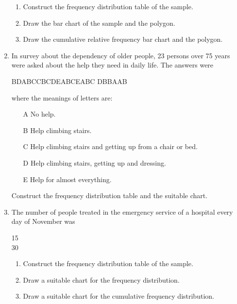 \begin{enumerate}[leftmargin=*]
\begin{enumerate}
\item Construct the frequency distribution table of the sample.
\item Draw the bar chart of the sample and the polygon.
\item Draw the cumulative relative frequency bar chart and the polygon. 
\end{enumerate}

\item In survey about the dependency of older people, 23 persons over 75 years were asked about the help they need in
daily life. 
The answers were
\begin{center}
B\quad D\quad A\quad B\quad C\quad C\quad B\quad C\quad D\quad E\quad A\quad B\quad C\quad E\quad A\quad B\quad C\quad
D\quad B\quad B\quad A\quad A\quad B 
\end{center}

where the meanings of letters are: 
\begin{enumerate}
\item[A] No help.
\item[B] Help climbing stairs.
\item[C] Help climbing stairs and getting up from a chair or bed.
\item[D] Help climbing stairs, getting up and dressing.
\item[E] Help for almost everything.  
\end{enumerate}

Construct the frequency distribution table and the suitable chart.

\item\label{emergency-service} The number of people treated in the emergency service of a hospital every day of November
was
\begin{center}
15               \\
30              
\end{center}

\begin{enumerate}
\item Construct the frequency distribution table of the sample.
\item Draw a suitable chart for the frequency distribution. 
\item Draw a suitable chart for the cumulative frequency distribution.
\end{enumerate}


\end{enumerate}
